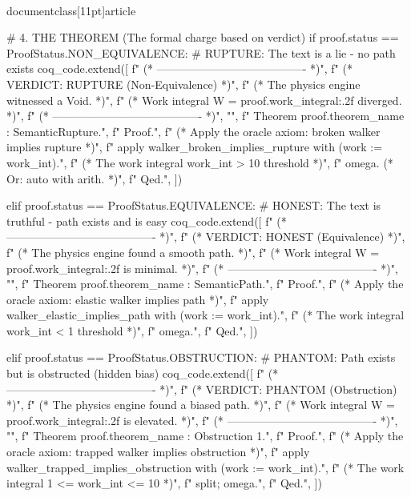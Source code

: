\\documentclass[11pt]{article}
\begin{document}
\begin{CodeBlock}
        # 4. THE THEOREM (The formal charge based on verdict)
        if proof.status == ProofStatus.NON_EQUIVALENCE:
            # RUPTURE: The text is a lie - no path exists
            coq_code.extend([
                f"  (* ---------------------------------------- *)",
                f"  (* VERDICT: RUPTURE (Non-Equivalence) *)",
                f"  (* The physics engine witnessed a Void. *)",
                f"  (* Work integral W = {proof.work_integral:.2f} diverged. *)",
                f"  (* ---------------------------------------- *)",
                "",
                f"  Theorem {proof.theorem_name} : SemanticRupture.",
                f"  Proof.",
                f"    (* Apply the oracle axiom: broken walker implies rupture *)",
                f"    apply walker_broken_implies_rupture with (work := {work_int}).",
                f"    (* The work integral {work_int} > 10 threshold *)",
                f"    omega.  (* Or: auto with arith. *)",
                f"  Qed.",
            ])

        elif proof.status == ProofStatus.EQUIVALENCE:
            # HONEST: The text is truthful - path exists and is easy
            coq_code.extend([
                f"  (* ---------------------------------------- *)",
                f"  (* VERDICT: HONEST (Equivalence) *)",
                f"  (* The physics engine found a smooth path. *)",
                f"  (* Work integral W = {proof.work_integral:.2f} is minimal. *)",
                f"  (* ---------------------------------------- *)",
                "",
                f"  Theorem {proof.theorem_name} : SemanticPath.",
                f"  Proof.",
                f"    (* Apply the oracle axiom: elastic walker implies path *)",
                f"    apply walker_elastic_implies_path with (work := {work_int}).",
                f"    (* The work integral {work_int} < 1 threshold *)",
                f"    omega.",
                f"  Qed.",
            ])

        elif proof.status == ProofStatus.OBSTRUCTION:
            # PHANTOM: Path exists but is obstructed (hidden bias)
            coq_code.extend([
                f"  (* ---------------------------------------- *)",
                f"  (* VERDICT: PHANTOM (Obstruction) *)",
                f"  (* The physics engine found a biased path. *)",
                f"  (* Work integral W = {proof.work_integral:.2f} is elevated. *)",
                f"  (* ---------------------------------------- *)",
                "",
                f"  Theorem {proof.theorem_name} : Obstruction 1.",
                f"  Proof.",
                f"    (* Apply the oracle axiom: trapped walker implies obstruction *)",
                f"    apply walker_trapped_implies_obstruction with (work := {work_int}).",
                f"    (* The work integral 1 <= {work_int} <= 10 *)",
                f"    split; omega.",
                f"  Qed.",
            ])


\end{CodeBlock}
\end{document}
